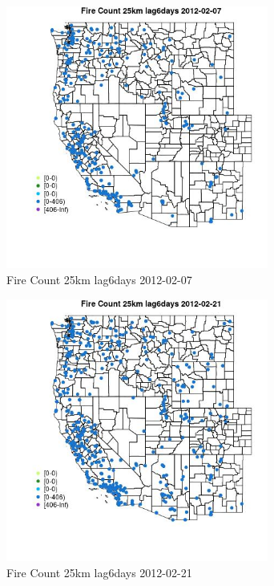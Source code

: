 \begin{figure} 
\centering  
\includegraphics[width=0.77\textwidth]{Code_Outputs/Report_ML_input_PM25_Step4_part_f_de_duplicated_aveswNAs_MapObsFire_Count_25km_lag6days2012-02-07.jpg} 
\caption{\label{fig:Report_ML_input_PM25_Step4_part_f_de_duplicated_aveswNAsMapObsFire_Count_25km_lag6days2012-02-07}Fire Count 25km lag6days 2012-02-07} 
\end{figure} 
 

\begin{figure} 
\centering  
\includegraphics[width=0.77\textwidth]{Code_Outputs/Report_ML_input_PM25_Step4_part_f_de_duplicated_aveswNAs_MapObsFire_Count_25km_lag6days2012-02-21.jpg} 
\caption{\label{fig:Report_ML_input_PM25_Step4_part_f_de_duplicated_aveswNAsMapObsFire_Count_25km_lag6days2012-02-21}Fire Count 25km lag6days 2012-02-21} 
\end{figure} 
 

